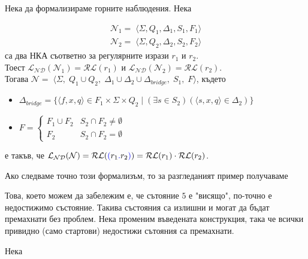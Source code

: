 \documentclass[12pt]{article}
\begin{document}
Нека да формализираме горните наблюдения. Нека

\begin{align*}
    \mathcal{N}_1 = \; \langle \Sigma, Q_1, \Delta_1, S_1, F_1 \rangle \\
    \mathcal{N}_2 = \; \langle \Sigma, Q_2, \Delta_2, S_2, F_2 \rangle
\end{align*}
са два НКА съответно за регулярните изрази \(r_1\) и \(r_2\). \\
Тоест \(\mathcal{L_{ND}}(\mathcal{N}_1) = \mathcal{RL}(r_1)\) и \(\mathcal{L_{ND}}(\mathcal{N}_2) = \mathcal{RL}(r_2)\). \\
Тогава \(\mathcal{N} = \;\langle \Sigma, \; Q_1 \cup Q_2, \; \Delta_1 \cup \Delta_2 \cup \Delta_{bridge}, \; S_1, \; F \rangle\), където
\begin{itemize}
    \item \(\Delta_{bridge} = \{ \langle f, x, q \rangle \in F_1 \times \Sigma \times Q_2 \mid (\exists s \in S_2)( \langle s, x, q \rangle \in \Delta_2)\}\)
    \item \(F = \begin{cases}
	F_1 \cup F_2 & S_2 \cap F_2 \neq \emptyset \\
    F_2 & S_2 \cap F_2 = \emptyset
\end{cases}\)
\end{itemize}
е такъв, че \(\mathcal{L_{ND}}(\mathcal{N}) = \mathcal{RL}(\textcolor{blue}{(} r_1 \textcolor{blue}{.} r_2 \textcolor{blue}{)} ) = \mathcal{RL}(r_1) \cdot \mathcal{RL}(r_2)\).

Ако следваме точно този формализъм, то за разгледаният пример получаваме
\begin{center}
\end{center}
Това, което можем да забележим е, че сътояние \(5\) е "висящо", по-точно е недостижимо състояние.
Такива състояния са излишни и могат да бъдат премахнати без проблем.
Нека променим въведената конструкция, така че всички привидно (само стартови) недостижи сътояния са премахнати. \\\par
Нека
\end{document}
